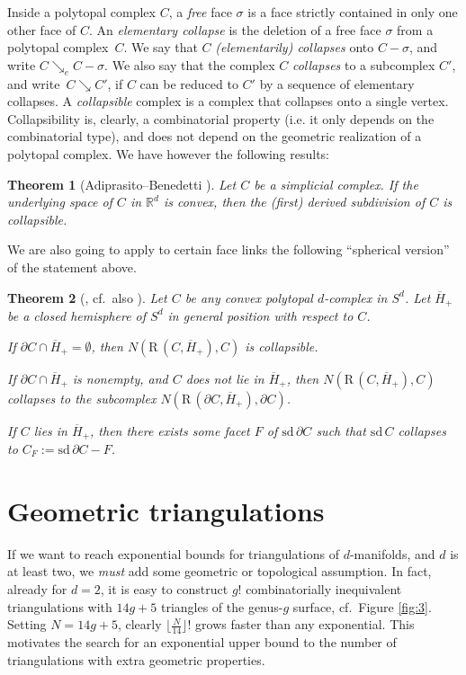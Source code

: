 \documentclass[a4paper,11pt]{article}
\theoremstyle{plain}
\newtheorem{theorem}{\bf Theorem}[section]
\theoremstyle{definition}
\newcommand{\RS}{\mathrm{R}\,}
\newcommand{\sd}{\mathrm{sd}\, }
\begin{document}
Inside a polytopal complex $C$, a \emph{free} face $\sigma$ is a face strictly contained in only one other face of $C$. An \emph{elementary collapse} is the deletion of a free face $\sigma$ from a polytopal complex~$C$. We say that $C$ \emph{(elementarily) collapses} onto $C-\sigma$, and write $C\searrow_e C-\sigma.$ We also say that the complex $C$ \emph{collapses} to a subcomplex $C'$, and write~$C\searrow C'$, if $C$ can be reduced to $C'$ by a sequence of elementary collapses. A \emph{collapsible} complex is a complex that collapses onto a single vertex. Collapsibility is, clearly, a combinatorial property (i.e. it only depends on the combinatorial type), and does not depend on the geometric realization of a polytopal complex. We have however the following results:

\begin{theorem}[Adiprasito--Benedetti \cite{AB-part2}] \label{thm:ConvexEndo}
Let $C$ be a simplicial complex. If the underlying space of $C$ in $\mathbb{R}^d$ is convex, then the (first) derived subdivision of $C$ is collapsible.
\end{theorem}

We are also going to apply to certain face links the following ``spherical version'' of the statement above.

\begin{theorem}[{\cite{AB-part2}, cf.~also \cite[Chapter II.2]{Athesis}}] \label{thm:ConvexEndo2}
Let $C$ be any convex polytopal $d$-complex in $S^d$. Let $\overline{H}_+$ be a closed hemisphere of $S^d$ in general position with respect to $C$. %
\begin{compactenum}[\rm (A)]
\item If $\partial C\cap \overline{H}_+=\emptyset$, then $N(\RS(C,\overline{H}_+),C)$ is collapsible.
\item If $\partial C\cap \overline{H}_+$ is nonempty, and $C$ does not lie in $\overline{H}_+$, then $N(\RS(C,\overline{H}_+),C)$ collapses to the subcomplex $N(\RS(\partial C,\overline{H}_+),\partial C)$.
\item If $C$ lies in $\overline{H}_+$, then there exists some facet $F$ of $\sd \partial C$ such that $\sd C$ collapses to $C_F:=\sd \partial C-F$.
\end{compactenum}
\end{theorem}





\section{Geometric triangulations}
If we want to reach exponential bounds for triangulations of $d$-manifolds, and $d$ is at least two, we \emph{must} add some geometric or topological assumption. In fact, already for $d=2$, it is easy to construct $g!$ combinatorially inequivalent triangulations with $14g+5$ triangles of the genus-$g$ surface, cf.~Figure \ref{fig:3}. Setting $N = 14g+5$, clearly  $\lfloor \frac{N}{14} \rfloor !$ grows faster than any exponential. This motivates the search for an exponential upper bound to the number of triangulations with extra geometric properties. 
\end{document}
